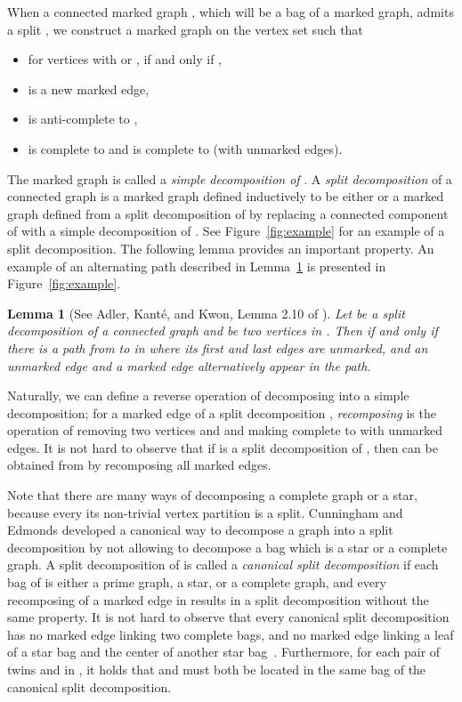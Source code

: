 \documentclass[11pt]{elsarticle}
\newtheorem{lemma}[theorem]{Lemma}
\begin{document}
When a connected marked graph , which will be a bag of a marked graph, admits a split , we construct a marked graph  on the vertex set  such that
\begin{itemize}
\item for vertices  with  or ,  if and only if ,
\item  is a new marked edge,
\item  is anti-complete to ,
\item  is complete to  and  is complete to  (with unmarked edges). 
\end{itemize}
The marked graph  is called a \emph{simple decomposition of} .
A \emph{split decomposition} of a connected graph  is a marked graph  defined inductively to be either  or a marked graph defined from a split decomposition 
of  by replacing a connected component  of  with a simple decomposition of .  See Figure~\ref{fig:example} for an example of a split decomposition.
The following lemma provides an important property. An example of an alternating path described in Lemma~\ref{lem:splitadj} is presented in Figure~\ref{fig:example}.

\begin{lemma}[See Adler, Kant\'e, and Kwon, Lemma 2.10 of \cite{AKK2014}]\label{lem:splitadj}
Let  be a split decomposition of a connected graph  and 
 be two vertices in .
Then  if and only if there is a path from  to  in  where its first and last edges are unmarked, and
an unmarked edge and a marked edge alternatively appear in the path. 
\end{lemma}
 
Naturally, we can define a reverse operation of decomposing into a simple decomposition; for a marked edge  of a split decomposition , 
\emph{recomposing } is the operation of removing two vertices  and  and making  complete to  with unmarked edges.
It is not hard to observe that if  is a split decomposition of , then  can be obtained from  by recomposing all marked edges.

Note that there are many ways of decomposing a complete graph or a star, because every its non-trivial vertex partition is a split.
Cunningham and Edmonds \cite{CunninghamE80} developed a canonical way to decompose a graph into a split decomposition by not allowing to decompose a bag which is a star or a complete graph.
A split decomposition  of  is called a \emph{canonical split decomposition} if each bag of  is either a prime graph, a star, or a complete graph, and 
every recomposing of a marked edge in  results in a split decomposition without the same property. It is not hard to observe that every canonical split decomposition has no marked edge linking two complete bags, and no marked edge linking a leaf of a star bag and the center of another star bag~\cite{Bouchet1988a}. Furthermore, for each pair of twins  and  in , it holds that  and  must both be located in the same bag of the canonical split decomposition. 
\end{document}
